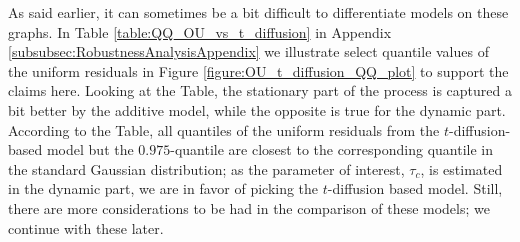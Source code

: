 As said earlier, it can sometimes be a bit difficult to differentiate models on these graphs. In Table \ref{table:QQ_OU_vs_t_diffusion} in Appendix \ref{subsubsec:RobustnessAnalysisAppendix} we illustrate select quantile values of the uniform residuals in Figure \ref{figure:OU_t_diffusion_QQ_plot} to support the claims here. Looking at the Table, the stationary part of the process is captured a bit better by the additive model, while the opposite is true for the dynamic part. According to the Table, all quantiles of the uniform residuals from the $t$-diffusion-based model but the $0.975$-quantile are closest to the corresponding quantile in the standard Gaussian distribution; as the parameter of interest, $\tau_c$, is estimated in the dynamic part, we are in favor of picking the $t$-diffusion based model. Still, there are more considerations to be had in the comparison of these models; we continue with these later.
